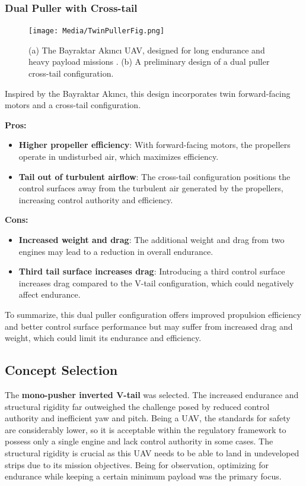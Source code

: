 \documentclass[12pt]{article}
\begin{document}
	\newpage
	
	\subsubsection{Dual Puller with Cross-tail}
	\begin{figure}[h!]
		\centering
		\texttt{[image: Media/TwinPullerFig.png]} %
		\caption{(a) The Bayraktar Akıncı UAV, designed for long endurance and heavy payload missions \cite{}. (b) A preliminary design of a dual puller cross-tail configuration.}
	\end{figure}
	Inspired by the Bayraktar Akıncı, this design incorporates twin forward-facing motors and a cross-tail configuration.
	
	\textbf{Pros:}
	\begin{itemize}
		\item \textbf{Higher propeller efficiency}: With forward-facing motors, the propellers operate in undisturbed air, which maximizes efficiency. 
		\item \textbf{Tail out of turbulent airflow}: The cross-tail configuration positions the control surfaces away from the turbulent air generated by the propellers, increasing control authority and efficiency. 
	\end{itemize}
	
	\textbf{Cons:}
	\begin{itemize}
		\item \textbf{Increased weight and drag}: The additional weight and drag from two engines may lead to a reduction in overall endurance.
		\item \textbf{Third tail surface increases drag}: Introducing a third control surface increases drag compared to the V-tail configuration, which could negatively affect endurance.
	\end{itemize}
	
	To summarize, this dual puller configuration offers improved propulsion efficiency and better control surface performance but may suffer from increased drag and weight, which could limit its endurance and efficiency.
	
	\newpage
	
	\subsection{Concept Selection}
	The \textbf{mono-pusher inverted V-tail} was selected. The increased endurance and structural rigidity far outweighed the challenge posed by reduced control authority and inefficient yaw and pitch. Being a UAV, the standards for safety are considerably lower, so it is acceptable within the regulatory framework to possess only a single engine and lack control authority in some cases. The structural rigidity is crucial as this UAV needs to be able to land in undeveloped strips due to its mission objectives. Being for observation, optimizing for endurance while keeping a certain minimum payload was the primary focus. 
	
\end{document}
